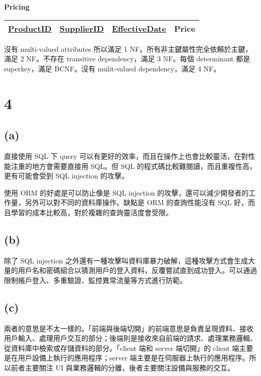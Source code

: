 \documentclass{article}
\begin{document}
\begin{table}[H]
    \centering
    \textbf{Pricing} \\
    \begin{tabular}{|c|c|c|c|}
        \hline
        \underline{ProductID} & \underline{SupplierID} & \underline{EffectiveDate} & Price\\
        \hline
    \end{tabular}
\end{table}

\noindent 沒有 multi-valued attributes 所以滿足 1 NF。所有非主鍵屬性完全依賴於主鍵，滿足 2 NF。不存在 transitive dependency，滿足 3 NF。每個 determinant 都是 superkey，滿足 BCNF。沒有 mulit-valued dependency，滿足 4 NF。


\section*{4}
\subsection*{(a)}
直接使用 SQL 下 query 可以有更好的效率，而且在操作上也會比較靈活，在對性能注重的地方會需要直接用 SQL。但 SQL 的程式碼比較難閱讀，而且重複性高，更有可能會受到 SQL injection 的攻擊。

使用 ORM 的好處是可以防止像是 SQL injection 的攻擊，還可以減少開發者的工作量，另外可以對不同的資料庫操作。缺點是 ORM 的查詢性能沒有 SQL 好，而且學習的成本比較高，對於複雜的查詢靈活度會受限。

\subsection*{(b)}
除了 SQL injection 之外還有一種攻擊叫資料庫暴力破解，這種攻擊方式會生成大量的用戶名和密碼組合以猜測用戶的登入資料，反覆嘗試直到成功登入。可以通過限制帳戶登入、多重驗證、監控異常流量等方式進行防範。


\subsection*{(c)}
兩者的意思是不太一樣的。「前端與後端切開」的前端意思是負責呈現資料、接收用戶輸入、處理用戶交互的部分；後端則是接收來自前端的請求、處理業務邏輯、從資料庫中檢索或存儲資料的部分。「client 端和 server 端切開」的 client 端主要是在用戶設備上執行的應用程序；server 端主要是在伺服器上執行的應用程序。所以前者主要關注 UI 與業務邏輯的分離，後者主要關注設備與服務的交互。
\end{document}
